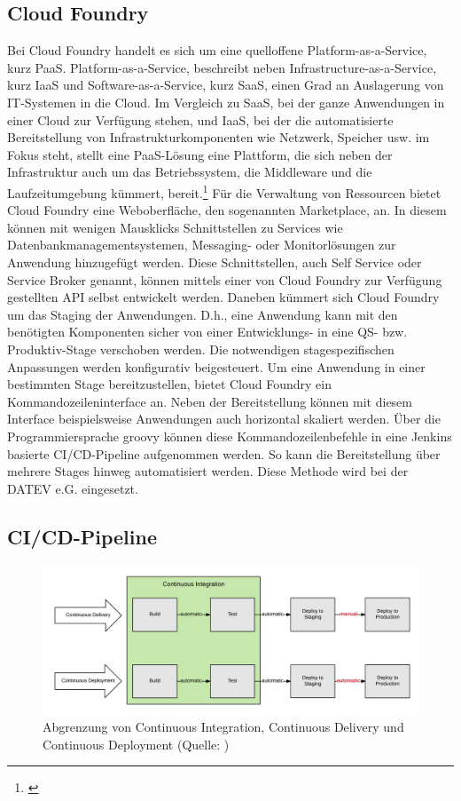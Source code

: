 \subsection{\glqq Cloud Foundry\grqq}\label{ssec:cloudfoundry}
Bei Cloud Foundry handelt es sich um eine quelloffene Platform-as-a-Service, kurz PaaS.
Platform-as-a-Service, beschreibt neben Infrastructure-as-a-Service, kurz IaaS und Software-as-a-Service, kurz SaaS, einen Grad an Auslagerung von IT-Systemen in die Cloud.
Im Vergleich zu SaaS, bei der ganze Anwendungen in einer Cloud zur Verfügung stehen, und IaaS, bei der die automatisierte Bereitstellung von Infrastrukturkomponenten wie Netzwerk, Speicher usw. im Fokus steht, stellt eine PaaS-Lösung eine Plattform, die sich neben der Infrastruktur auch um das Betriebssystem, die Middleware und die Laufzeitumgebung kümmert, bereit.\footnote{\cite{.25.2.2020}}
Für die Verwaltung von Ressourcen bietet Cloud Foundry eine Weboberfläche, den sogenannten \glqq Marketplace\grqq, an.
In diesem können mit wenigen Mausklicks Schnittstellen zu Services wie Datenbankmanagementsystemen, Messaging- oder Monitorlösungen zur Anwendung hinzugefügt werden.
Diese Schnittstellen, auch \glqq Self Service\grqq{} oder \glqq Service Broker\grqq{} genannt, können mittels einer von Cloud Foundry zur Verfügung gestellten API selbst entwickelt werden.
Daneben kümmert sich Cloud Foundry um das Staging der Anwendungen.
D.h., eine Anwendung kann mit den benötigten Komponenten sicher von einer Entwicklungs- in eine QS- bzw. Produktiv-Stage verschoben werden. 
Die notwendigen stagespezifischen Anpassungen werden konfigurativ beigesteuert.
Um eine Anwendung in einer bestimmten Stage bereitzustellen, bietet Cloud Foundry ein Kommandozeileninterface an.
Neben der Bereitstellung können mit diesem Interface beispielsweise Anwendungen auch horizontal skaliert werden.
Über die Programmiersprache groovy können diese Kommandozeilenbefehle in eine Jenkins basierte CI/CD-Pipeline aufgenommen werden.
So kann die Bereitstellung über mehrere Stages hinweg automatisiert werden.
Diese Methode wird bei der DATEV e.G. eingesetzt.
\cite{.23.2.2020c}

\subsection{\glqq CI/CD-Pipeline\grqq}\label{sec:cicd}
\begin{figure}[h]
	\centering
	\includegraphics[width=\textwidth]{figures/ci-cd-flow-desktop_1.png}
	\caption{Abgrenzung von Continuous Integration, Continuous Delivery und Continuous Deployment  (Quelle: \cite{.25.2.2020d})}
	\label{fig:cicd}
\end{figure}

